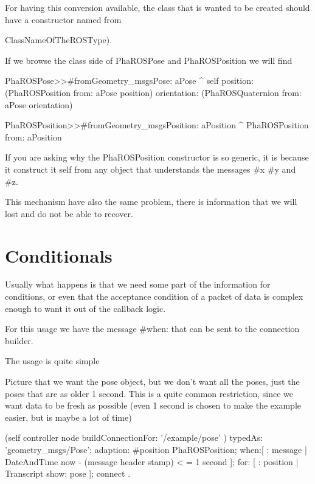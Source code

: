 \documentclass[a4paper,10pt,twoside]{book}
\begin{document}
							For having this conversion available, the class that is wanted to be created should have a constructor named from{ClassNameOfTheROSType). 
							
							
							If we browse the class side of PhaROSPose and PhaROSPosition we will find
							
							
					\begin{code}
PhaROSPose>>#fromGeometry_msgsPose: aPose
	^ self position: (PhaROSPosition from: aPose position) orientation: (PhaROSQuaternion from: aPose orientation)

PhaROSPosition>>#fromGeometry_msgsPosition: aPosition
	^ PhaROSPosition from: aPosition
	
					\end{code}
						
							If you are asking why the PhaROSPosition constructor is so generic, it is because it construct it self from any object that understands the messages \#x \#y and \#z. 
							
							
							This mechanism have also the same problem, there is information that we will lost and do not be able to recover.		
						
						
					\section {Conditionals}
					
							Usually what happens is that we need some part of the information for conditions, or even that the acceptance condition of a packet of data is complex enough to want it out of the callback logic. 
							
							For this usage we have the message \#when: that can be sent to the connection builder.
							
							The usage is quite simple
							
							Picture that we want the pose object, but we don't want all the poses, just the poses that are as older 1 second. 
							This is a quite common restriction, since we want data to be fresh as possible (even 1 second is chosen to make the example easier, but is maybe a lot of time)
							
							
							
							\begin{code}
				(self controller node buildConnectionFor: '/example/pose' ) 
					typedAs: 'geometry_msgs/Pose'; 
					adaption: #position \> PhaROSPosition;
					when:[ : message | DateAndTime now - (message header stamp) < = 1 second ];
					for: [ : position |  Transcript show: pose ];
					connect .
					

\end{code}}
\end{document}
